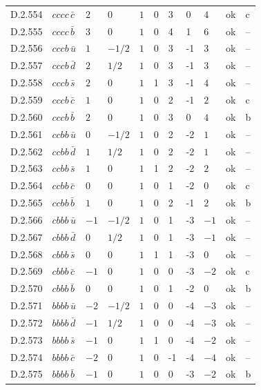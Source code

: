 {\begin{longtable}{@{}llllllllll>{\raggedright\arraybackslash}p{2.0cm}@{}}
D.2.554 & $cccc\,\bar{c}$ & $2$ & $0$ & $1$ & 0 & 3 & 0 & $4$ & ok & c \\
D.2.555 & $cccc\,\bar{b}$ & $3$ & $0$ & $1$ & 0 & 4 & 1 & $6$ & ok & -- \\
D.2.556 & $cccb\,\bar{u}$ & $1$ & $-1/2$ & $1$ & 0 & 3 & -1 & $3$ & ok & -- \\
D.2.557 & $cccb\,\bar{d}$ & $2$ & $1/2$ & $1$ & 0 & 3 & -1 & $3$ & ok & -- \\
D.2.558 & $cccb\,\bar{s}$ & $2$ & $0$ & $1$ & 1 & 3 & -1 & $4$ & ok & -- \\
D.2.559 & $cccb\,\bar{c}$ & $1$ & $0$ & $1$ & 0 & 2 & -1 & $2$ & ok & c \\
D.2.560 & $cccb\,\bar{b}$ & $2$ & $0$ & $1$ & 0 & 3 & 0 & $4$ & ok & b \\
D.2.561 & $ccbb\,\bar{u}$ & $0$ & $-1/2$ & $1$ & 0 & 2 & -2 & $1$ & ok & -- \\
D.2.562 & $ccbb\,\bar{d}$ & $1$ & $1/2$ & $1$ & 0 & 2 & -2 & $1$ & ok & -- \\
D.2.563 & $ccbb\,\bar{s}$ & $1$ & $0$ & $1$ & 1 & 2 & -2 & $2$ & ok & -- \\
D.2.564 & $ccbb\,\bar{c}$ & $0$ & $0$ & $1$ & 0 & 1 & -2 & $0$ & ok & c \\
D.2.565 & $ccbb\,\bar{b}$ & $1$ & $0$ & $1$ & 0 & 2 & -1 & $2$ & ok & b \\
D.2.566 & $cbbb\,\bar{u}$ & $-1$ & $-1/2$ & $1$ & 0 & 1 & -3 & $-1$ & ok & -- \\
D.2.567 & $cbbb\,\bar{d}$ & $0$ & $1/2$ & $1$ & 0 & 1 & -3 & $-1$ & ok & -- \\
D.2.568 & $cbbb\,\bar{s}$ & $0$ & $0$ & $1$ & 1 & 1 & -3 & $0$ & ok & -- \\
D.2.569 & $cbbb\,\bar{c}$ & $-1$ & $0$ & $1$ & 0 & 0 & -3 & $-2$ & ok & c \\
D.2.570 & $cbbb\,\bar{b}$ & $0$ & $0$ & $1$ & 0 & 1 & -2 & $0$ & ok & b \\
D.2.571 & $bbbb\,\bar{u}$ & $-2$ & $-1/2$ & $1$ & 0 & 0 & -4 & $-3$ & ok & -- \\
D.2.572 & $bbbb\,\bar{d}$ & $-1$ & $1/2$ & $1$ & 0 & 0 & -4 & $-3$ & ok & -- \\
D.2.573 & $bbbb\,\bar{s}$ & $-1$ & $0$ & $1$ & 1 & 0 & -4 & $-2$ & ok & -- \\
D.2.574 & $bbbb\,\bar{c}$ & $-2$ & $0$ & $1$ & 0 & -1 & -4 & $-4$ & ok & -- \\
D.2.575 & $bbbb\,\bar{b}$ & $-1$ & $0$ & $1$ & 0 & 0 & -3 & $-2$ & ok & b \\
\end{longtable}}

